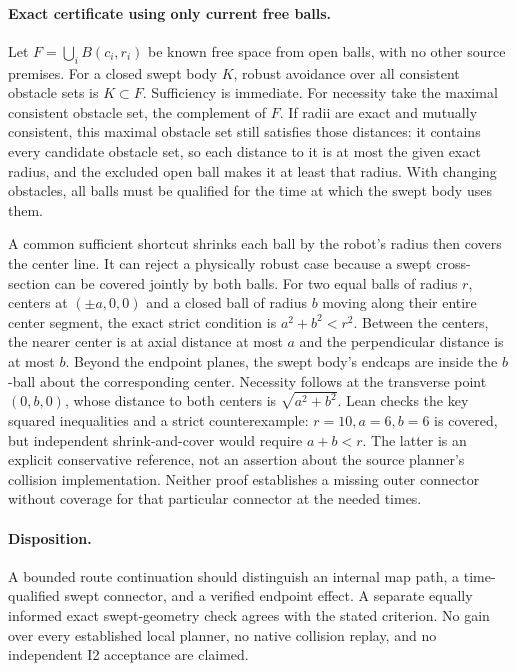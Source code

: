 \documentclass[11pt]{article}
\begin{document}
\paragraph{Exact certificate using only current free balls.}
Let \(F=\bigcup_i B(c_i,r_i)\) be known free space from open balls,
with no other source premises. For a closed swept body \(K\), robust
avoidance over all consistent obstacle sets is \(K\subset F\).
Sufficiency is immediate. For necessity take the maximal consistent
obstacle set, the complement of \(F\). If radii are exact and
mutually consistent, this maximal obstacle set still satisfies those
distances: it contains every candidate obstacle set, so each distance
to it is at most the given exact radius, and the excluded open ball
makes it at least that radius. With changing obstacles, all balls
must be qualified for the time at which the swept body uses them.

A common sufficient shortcut shrinks each ball by the robot's radius
then covers the center line. It can reject a physically robust case
because a swept cross-section can be covered jointly by both balls.
For two equal balls of radius \(r\), centers at \((\pm a,0,0)\) and a
closed ball of radius \(b\) moving along their entire center segment,
the exact strict condition is \(a^2+b^2<r^2\).
Between the centers, the nearer center is at axial distance at most
\(a\) and the perpendicular distance is at most \(b\).
Beyond the endpoint planes, the swept body's endcaps are inside the
\(b\)-ball about the corresponding center. Necessity follows at
the transverse point \((0,b,0)\), whose distance to both centers is
\(\sqrt{a^2+b^2}\). Lean checks the key squared inequalities and a
strict counterexample: \(r=10,a=6,b=6\) is covered, but independent
shrink-and-cover would require \(a+b<r\).
The latter is an explicit conservative reference, not an assertion
about the source planner's collision implementation.
Neither proof establishes a missing outer connector without coverage for
that particular connector at the needed times.

\paragraph{Disposition.}
A bounded route continuation should distinguish an internal map path,
a time-qualified swept connector, and a verified endpoint effect.
A separate equally informed exact swept-geometry check agrees with the
stated criterion. No gain over every established local planner, no
native collision replay, and no independent I2 acceptance are claimed.
\end{document}
